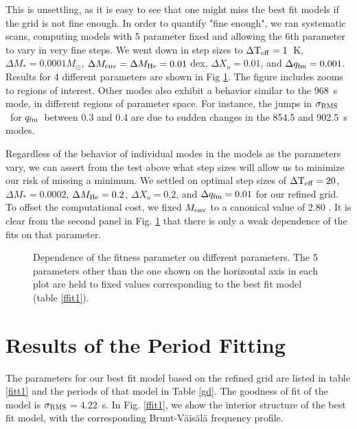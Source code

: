 \documentclass[12pt,preprint]{aastex}
\newcommand{\bvf}{Brunt-V\"ais\"al\"a }
\newcommand{\sigrms}{$\sigma_{\rm RMS}$}
\newcommand{\qfm}{$q_{\rm fm}$}
\begin{document}
This is unsettling, as it is easy to see that one might miss the best fit 
models if the grid is not fine enough. In order to quantify "fine enough", 
we ran systematic scans, computing models with 5 parameter fixed and allowing 
the 6th parameter to vary in very fine steps. We went down in 
step sizes to $\Delta {\rm T_{eff}}=1$~K, $\Delta M_*=0.0001 M_\odot$, 
$\Delta M_{\rm env}= \Delta M_{\rm He}=0.01$ dex, $\Delta X_o=0.01$, and $\Delta q_{\rm fm}=0.001$. 
Results for 4 different parameters are shown in Fig \ref{ffit4}. The figure 
includes zooms to regions of interest. Other modes also exhibit a behavior 
similar to the 968~s mode, in different regions of parameter space. For instance, 
the jumps in \sigrms\ for \qfm\ between 0.3 and 0.4 are due 
to sudden changes in the 854.5 and 902.5~s modes.

Regardless of the behavior of individual modes in the models as the parameters vary, 
we can assert from the test above what step sizes will allow us to minimize our risk 
of missing a minimum. We settled on optimal step sizes of 
$\Delta {\rm T_{eff}}=20$, $\Delta M_*=0.0002$, $\Delta M_{\rm He}=0.2$, 
$\Delta X_o=0.2$, and $\Delta q_{\rm fm}=0.01$ for our refined grid. To offset 
the computational cost, we fixed $M_{\rm env}$ to a canonical value of 
2.80 \citep{Dehner95}. It is clear from the second panel in Fig. \ref{ffit4} 
that there is only a weak dependence of the fits on that parameter.
		
\begin{figure}
\caption{
\label{ffit4}
Dependence of the fitness parameter on different parameters. The 5 parameters other than the one shown 
on the horizontal axis in each plot are held to fixed values corresponding to the best fit model (table \ref{ffit1}).
}


\end{figure}

\section{Results of the Period Fitting}
\label{results}

The parameters for our best fit model based on the refined grid are listed in table \ref{fitt1} and the periods of that model in 
Table \ref{gd}. The goodness of fit of the model is \sigrms$=4.22$~s. In Fig. \ref{ffit1}, we show the interior structure of 
the best fit model, with the corresponding \bvf frequency profile.
\end{document}
